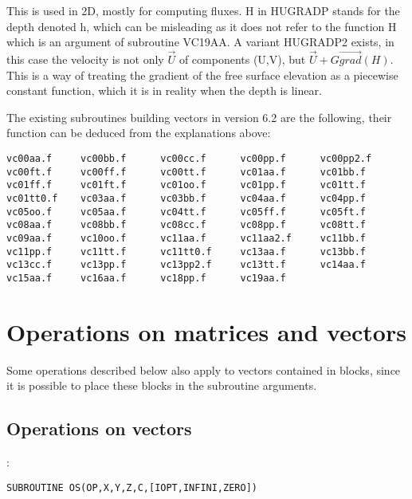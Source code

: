 This is used in 2D, mostly for computing fluxes. H in HUGRADP stands for the
depth denoted h, which can be misleading as it does not refer to the function H
which is an argument of subroutine VC19AA. A variant HUGRADP2 exists, in this
case the velocity is not only $\vec{U}$ of components (U,V), but $\vec{U}+G
 \overrightarrow{grad} ( H ) $. This is a way of treating the gradient
of the free surface elevation as a piecewise constant function, which it is in
reality when the depth is linear.

The existing subroutines building vectors in version 6.2 are the following,
their function can be deduced from the explanations above:

\begin{verbatim}
vc00aa.f     vc00bb.f      vc00cc.f      vc00pp.f      vc00pp2.f
vc00ft.f     vc00ff.f      vc00tt.f      vc01aa.f      vc01bb.f
vc01ff.f     vc01ft.f      vc01oo.f      vc01pp.f      vc01tt.f
vc01tt0.f    vc03aa.f      vc03bb.f      vc04aa.f      vc04pp.f
vc05oo.f     vc05aa.f      vc04tt.f      vc05ff.f      vc05ft.f
vc08aa.f     vc08bb.f      vc08cc.f      vc08pp.f      vc08tt.f
vc09aa.f     vc10oo.f      vc11aa.f      vc11aa2.f     vc11bb.f
vc11pp.f     vc11tt.f      vc11tt0.f     vc13aa.f      vc13bb.f
vc13cc.f     vc13pp.f      vc13pp2.f     vc13tt.f      vc14aa.f
vc15aa.f     vc16aa.f      vc18pp.f      vc19aa.f
\end{verbatim}

\section{Operations on matrices and vectors}

Some operations described below also apply to vectors contained in blocks,
since it is possible to place these blocks in the subroutine arguments.

\subsection{Operations on vectors}

:
\begin{lstlisting}[language=TelFortran]
SUBROUTINE OS(OP,X,Y,Z,C,[IOPT,INFINI,ZERO])
\end{lstlisting}

